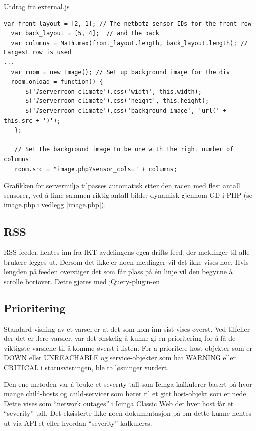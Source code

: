Utdrag fra external.js
\begin{lstlisting}[style=example]
 var front_layout = [2, 1]; // The netbotz sensor IDs for the front row
  var back_layout = [5, 4];  // and the back
  var columns = Math.max(front_layout.length, back_layout.length); // Largest row is used 
...
  var room = new Image(); // Set up background image for the div
  room.onload = function() {
      $('#serverroom_climate').css('width', this.width);
      $('#serverroom_climate').css('height', this.height);
      $('#serverroom_climate').css('background-image', 'url(' + this.src + ')');
   };

   // Set the background image to be one with the right number of columns
   room.src = "image.php?sensor_cols=" + columns;
\end{lstlisting}

Grafikken for servermiljø tilpasses automatisk etter den raden med flest antall sensorer, ved å lime sammen riktig antall bilder dynamisk gjennom GD i PHP (se image.php i vedlegg \ref{image.php}).

\subsection{RSS}

RSS-feeden hentes inn fra IKT-avdelingens egen drifts-feed, der meldinger til alle brukere legges ut. Dersom det ikke er noen meldinger vil det ikke vises noe. Hvis lengden på feeden overstiger det som får plass på én linje vil den begynne å scrolle bortover. Dette gjøres med jQuery-plugin-en \cite{jqmarquee}.

\subsection{Prioritering}
Standard visning av et varsel er at det som kom inn sist vises øverst. Ved tilfeller der det er flere varsler, var det ønskelig å kunne gi en prioritering for å få de viktigste varslene til å komme øverst i listen. For å prioritere host-objekter som er DOWN eller UNREACHABLE og service-objekter som har WARNING eller CRITICAL i statusvisningen, ble to løsninger vurdert. 

Den ene metoden var å bruke et severity-tall som Icinga kalkulerer basert på hvor mange child-hosts og child-servicer som hører til et gitt host-objekt som er nede. Dette vises som ``network outages'' i Icinga Classic Web der hver host får et ``severity''-tall. Det eksisterte ikke noen dokumentasjon på om dette kunne hentes ut via API-et eller hvordan ``severity'' kalkuleres. 

